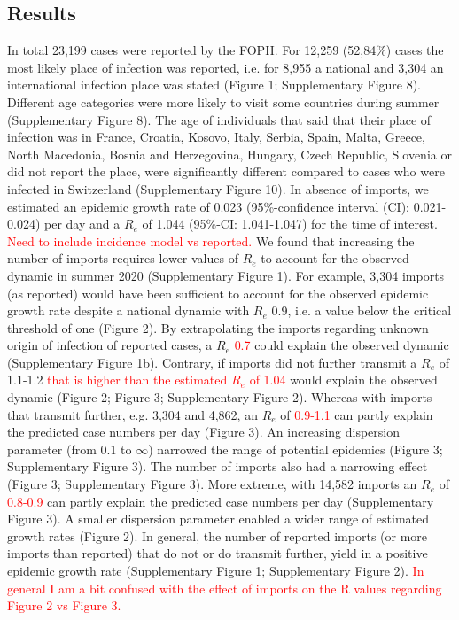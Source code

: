 \documentclass[10pt, a4paper, twoside]{article}
\begin{document}
\begin{multicols}{2}
\section{Results}
In total 23,199 cases were reported by the FOPH. 
For 12,259 (52,84\%) cases the most likely place of infection was reported, i.e. for 8,955 a national and 3,304 an international infection place was stated (Figure 1; Supplementary Figure 8). 
Different age categories were more likely to visit some countries during summer (Supplementary Figure 8). 
The age of individuals that said that their place of infection was in France, Croatia, Kosovo, Italy, Serbia, Spain, Malta, Greece, North Macedonia, Bosnia and Herzegovina, Hungary, Czech Republic, Slovenia  or did not report the place, were significantly different compared to cases who were infected in Switzerland (Supplementary Figure 10).
In absence of imports, we estimated an epidemic growth rate of 0.023 (95\%-confidence interval (CI): 0.021-0.024) per day and a $R_e$ of 1.044 (95\%-CI: 1.041-1.047) for the time of interest.
\textcolor{red}{Need to include incidence model vs reported.} 
We found that increasing the number of imports requires lower values of $R_e$ to account for the observed dynamic in summer 2020 (Supplementary Figure 1). 
For example, 3,304 imports (as reported) would have been sufficient to account for the observed epidemic growth rate despite a national dynamic with $R_e$ 0.9, i.e. a value below the critical threshold of one (Figure 2). 
By extrapolating the imports regarding unknown origin of infection of reported cases, a $R_e$ \textcolor{red}{0.7} could explain the observed dynamic (Supplementary Figure 1b). 
Contrary, if imports did not further transmit a $R_e$ of 1.1-1.2 \textcolor{red}{that is higher than the estimated $R_e$ of 1.04} would explain the observed dynamic (Figure 2; Figure 3; Supplementary Figure 2). 
Whereas with imports that transmit further, e.g. 3,304 and 4,862, an $R_e$ of \textcolor{red}{0.9-1.1} can partly explain the predicted case numbers per day (Figure 3). 
An increasing dispersion parameter (from 0.1 to $\infty$) narrowed the range of potential epidemics (Figure 3; Supplementary Figure 3).
The number of imports also had a narrowing effect (Figure 3; Supplementary Figure 3).
More extreme, with 14,582 imports an $R_e$ of \textcolor{red}{0.8-0.9} can partly explain the predicted case numbers per day (Supplementary Figure 3). 
A smaller dispersion parameter enabled a wider range of estimated growth rates (Figure 2). 
In general, the number of reported imports (or more imports than reported) that do not or do transmit further, yield in a positive epidemic growth rate (Supplementary Figure 1; Supplementary Figure 2).
\textcolor{red}{In general I am a bit confused with the effect of imports on the R values regarding Figure 2 vs Figure 3.}

\end{multicols}
\end{document}
